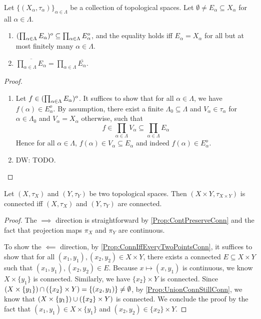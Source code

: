 \documentclass[screen,single]{techreport}
\numberwithin{equation}{section}
\newcommand{\diw}[1]{{\color{Red} DW: #1}}
\begin{document}
\begin{proposition}\label{Prop:IntProdSubProdIntAndCloProdEqProdClo}
	Let $\{(X_\alpha,\tau_\alpha)\}_{\alpha \in \Lambda}$ be a collection of topological spaces.
	Let $\emptyset \neq E_\alpha \subseteq X_\alpha$ for all $\alpha \in \Lambda$.
	\begin{enumerate}
		\item $({\prod_{\alpha \in \Lambda} E_\alpha})^o \subseteq \prod_{\alpha \in \Lambda} E_\alpha^o$, and the equality holds iff $E_\alpha = X_\alpha$ for all but at most finitely many $\alpha \in \Lambda$.
		\item $\overline{\prod_{\alpha \in \Lambda} E_\alpha} = \prod_{\alpha \in \Lambda} \overline{E_\alpha}$.
	\end{enumerate}
\end{proposition}
\begin{proof}\
	\begin{enumerate}
		\item Let $f \in ({\prod_{\alpha \in \Lambda} E_\alpha})^o$.
		It suffices to show that for all $\alpha \in \Lambda$, we have $f(\alpha) \in E_\alpha^o$.
		By assumption, there exist a finite $\Lambda_0 \subseteq \Lambda$ and $V_\alpha \in \tau_\alpha$ for $\alpha \in \Lambda_0$ and $V_\alpha = X_\alpha$ otherwise, such that
		\[
		f \in \prod_{\alpha \in \Lambda} V_\alpha \subseteq \prod_{\alpha \in \Lambda} E_\alpha
		\]
		Hence for all $\alpha \in \Lambda$, $f(\alpha) \in V_\alpha \subseteq E_\alpha$ and indeed $f(\alpha) \in E_\alpha^o$.
		
		\item \diw{TODO.}
	\end{enumerate}
\end{proof}

\begin{proposition}\label{Prop:ProdConnIffBothConn}
	Let $(X,\tau_X)$ and $(Y,\tau_Y)$ be two topological spaces.
	Then $(X\times Y,\tau_{X \times Y})$ is connected iff $(X,\tau_X)$ and $(Y,\tau_Y)$ are connected.
\end{proposition}
\begin{proof}
	The $\implies$ direction is straightforward by \cref{Prop:ContPreserveConn} and the fact that projection maps $\pi_X$ and $\pi_Y$ are continuous.
	
	To show the $\impliedby$ direction, by \ref{Prop:ConnIffEveryTwoPointsConn}, it suffices to show that for all $(x_1,y_1),(x_2,y_2) \in X \times Y$, there exists a connected $E \subseteq X \times Y$ such that $(x_1,y_1),(x_2,y_2) \in E$.
	Because $x \mapsto (x,y_1)$ is continuous, we know $X \times \{y_1\}$ is connected.
	Similarly, we have $\{x_2\} \times Y$ is connected.
	Since $(X \times \{ {y_1} \}) \cap (\{ {x_2} \} \times Y) = \{ (x_2,y_1) \} \neq \emptyset$, by \cref{Prop:UnionConnStillConn}, we know that $(X \times \{ {y_1} \}) \cup (\{ {x_2} \} \times Y)$ is connected.
	We conclude the proof by the fact that $(x_1,y_1) \in X \times \{y_1\}$ and $(x_2,y_2) \in \{x_2\} \times Y$.
\end{proof}
\end{document}
